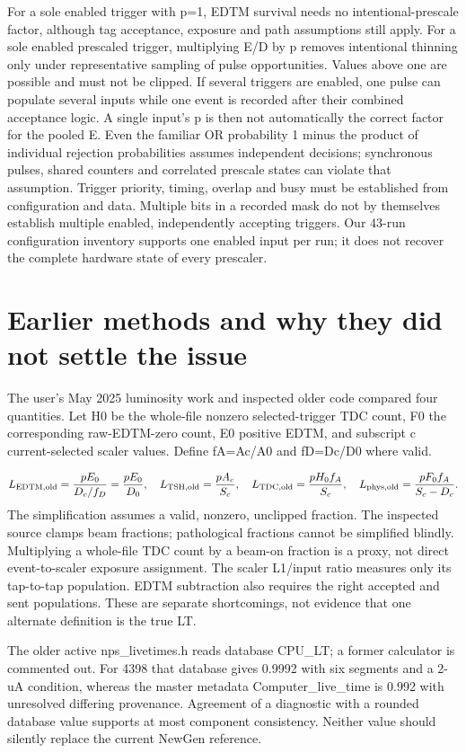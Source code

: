 For a sole enabled trigger with p=1, EDTM survival needs no intentional-prescale factor, although tag acceptance, exposure and path assumptions still apply. For a sole enabled prescaled trigger, multiplying E/D by p removes intentional thinning only under representative sampling of pulse opportunities. Values above one are possible and must not be clipped. If several triggers are enabled, one pulse can populate several inputs while one event is recorded after their combined acceptance logic. A single input's p is then not automatically the correct factor for the pooled E. Even the familiar OR probability 1 minus the product of individual rejection probabilities assumes independent decisions; synchronous pulses, shared counters and correlated prescale states can violate that assumption. Trigger priority, timing, overlap and busy must be established from configuration and data. Multiple bits in a recorded mask do not by themselves establish multiple enabled, independently accepting triggers. Our 43-run configuration inventory supports one enabled input per run; it does not recover the complete hardware state of every prescaler.


\section{Earlier methods and why they did not settle the issue}
The user's May 2025 luminosity work and inspected older code compared four quantities. Let H0 be the whole-file nonzero selected-trigger TDC count, F0 the corresponding raw-EDTM-zero count, E0 positive EDTM, and subscript c current-selected scaler values. Define fA=Ac/A0 and fD=Dc/D0 where valid.


\[
L_{\rm EDTM,old}=\frac{pE_0}{D_c/f_D}=\frac{pE_0}{D_0},\quad
L_{\rm TSH,old}=\frac{pA_c}{S_c},\quad
L_{\rm TDC,old}=\frac{pH_0f_A}{S_c},\quad
L_{\rm phys,old}=\frac{pF_0f_A}{S_c-D_c}.
\]
The simplification assumes a valid, nonzero, unclipped fraction. The inspected source clamps beam fractions; pathological fractions cannot be simplified blindly. Multiplying a whole-file TDC count by a beam-on fraction is a proxy, not direct event-to-scaler exposure assignment. The scaler L1/input ratio measures only its tap-to-tap population. EDTM subtraction also requires the right accepted and sent populations. These are separate shortcomings, not evidence that one alternate definition is the true LT.


The older active nps\_livetimes.h reads database CPU\_LT; a former calculator is commented out. For 4398 that database gives 0.9992 with six segments and a 2-uA condition, whereas the master metadata Computer\_live\_time is 0.992 with unresolved differing provenance. Agreement of a diagnostic with a rounded database value supports at most component consistency. Neither value should silently replace the current NewGen reference.



